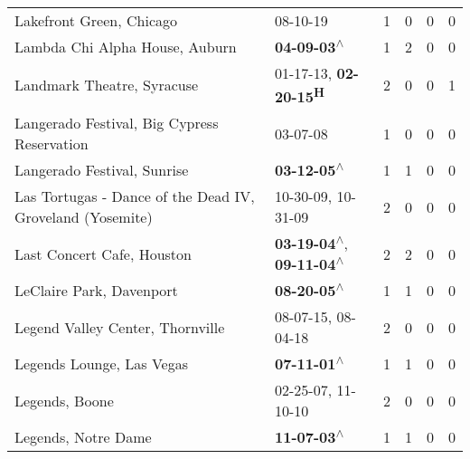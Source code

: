 \begin{supertabular}{p{0.4\textwidth}p{0.3\textwidth}p{0.05\textwidth}p{0.05\textwidth}p{0.05\textwidth}p{0.05\textwidth}}
                                                     Lakefront Green, Chicago &                                                                  08-10-19\textsuperscript{} &  1 &  0 &  0 &  0 \\
                                               Lambda Chi Alpha House, Auburn &                                                 \textbf{04-09-03\textsuperscript{$\wedge$}} &  1 &  2 &  0 &  0 \\
                                                   Landmark Theatre, Syracuse &                            01-17-13\textsuperscript{}, \textbf{02-20-15\textsuperscript{H}} &  2 &  0 &  0 &  1 \\
                                  Langerado Festival, Big Cypress Reservation &                                                                  03-07-08\textsuperscript{} &  1 &  0 &  0 &  0 \\
                                                  Langerado Festival, Sunrise &                                                 \textbf{03-12-05\textsuperscript{$\wedge$}} &  1 &  1 &  0 &  0 \\
                    Las Tortugas - Dance of the Dead IV, Groveland (Yosemite) &                                      10-30-09\textsuperscript{}, 10-31-09\textsuperscript{} &  2 &  0 &  0 &  0 \\
                                                   Last Concert Cafe, Houston &    \textbf{03-19-04\textsuperscript{$\wedge$}}, \textbf{09-11-04\textsuperscript{$\wedge$}} &  2 &  2 &  0 &  0 \\
                                                     LeClaire Park, Davenport &                                                 \textbf{08-20-05\textsuperscript{$\wedge$}} &  1 &  1 &  0 &  0 \\
                                             Legend Valley Center, Thornville &                                      08-07-15\textsuperscript{}, 08-04-18\textsuperscript{} &  2 &  0 &  0 &  0 \\
                                                    Legends Lounge, Las Vegas &                                                 \textbf{07-11-01\textsuperscript{$\wedge$}} &  1 &  1 &  0 &  0 \\
                                                               Legends, Boone &                                      02-25-07\textsuperscript{}, 11-10-10\textsuperscript{} &  2 &  0 &  0 &  0 \\
                                                          Legends, Notre Dame &                                                 \textbf{11-07-03\textsuperscript{$\wedge$}} &  1 &  1 &  0 &  0 \\

\end{supertabular}
